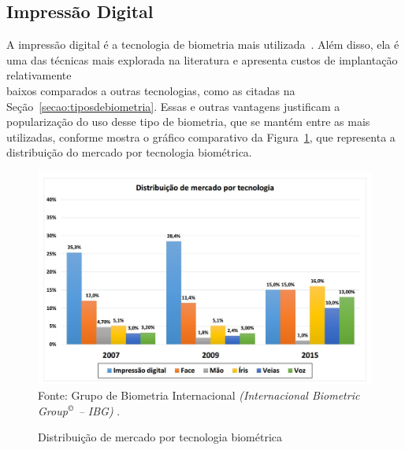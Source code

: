 \subsection{Impressão Digital}

  A impressão digital é a tecnologia de biometria mais utilizada~\cite{bosworth2014computer}. Além disso, ela é uma das técnicas mais explorada na literatura e apresenta custos de implantação relativamente \\baixos comparados a outras tecnologias, como as citadas na Seção~\ref{secao:tiposdebiometria}. Essas e outras vantagens justificam a popularização do uso desse tipo de biometria, que se mantém  entre as mais utilizadas, conforme mostra o gráfico comparativo da Figura~\ref{mercado_bio}, que representa a distribuição do mercado por tecnologia biométrica.


  \begin{figure}[ht]
  \begin{center}
  \caption{Distribuição de mercado por tecnologia biométrica}
  \includegraphics[scale=0.55]{figuras/cap2/mercado_bio.jpg}\\
  Fonte: Grupo de Biometria Internacional \textit{(\textit{Internacional Biometric Group$^{\copyright}$} -- IBG)} \cite{larsen2008biometric, zhang20133d, bosworth2014computer}.
  \label{mercado_bio}
  \end{center}
  \end{figure}



